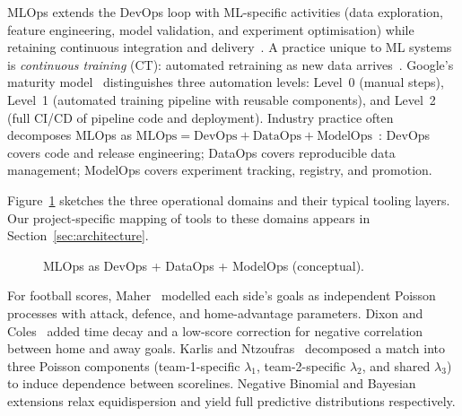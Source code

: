 \documentclass[conference]{IEEEtran}
\begin{document}
MLOps extends the DevOps loop with ML-specific activities (data exploration,
feature engineering, model validation, and experiment optimisation) while
retaining continuous integration and delivery~\cite{moreschini2022mlops}.
A practice unique to ML systems is \emph{continuous training} (CT): automated
retraining as new data arrives~\cite{google_mlops}.
Google's maturity model~\cite{google_mlops} distinguishes three automation
levels: Level~0 (manual steps), Level~1 (automated training pipeline with
reusable components), and Level~2 (full CI/CD of pipeline code and deployment).
Industry practice often decomposes MLOps as
$\text{MLOps} = \text{DevOps} + \text{DataOps} + \text{ModelOps}$~\cite{databricks_bigbook}:
DevOps covers code and release engineering; DataOps covers reproducible data
management; ModelOps covers experiment tracking, registry, and promotion.

Figure~\ref{fig:mlops_decomp} sketches the three operational domains and their
typical tooling layers.
Our project-specific mapping of tools to these domains appears in
Section~\ref{sec:architecture}.

\begin{figure}[t]
  \centering
  \caption{MLOps as DevOps + DataOps + ModelOps (conceptual).}
  \label{fig:mlops_decomp}
\end{figure}

For football scores, Maher~\cite{maher1982modelling} modelled each side's goals
as independent Poisson processes with attack, defence, and home-advantage
parameters.
Dixon and Coles~\cite{dixon1997modelling} added time decay and a low-score
correction for negative correlation between home and away goals.
Karlis and Ntzoufras~\cite{karlis2003analysis} decomposed a match into three
Poisson components (team-1-specific $\lambda_1$, team-2-specific $\lambda_2$, and
shared $\lambda_3$) to induce dependence between scorelines.
Negative Binomial and Bayesian extensions relax equidispersion and yield full
predictive distributions respectively.
\end{document}
